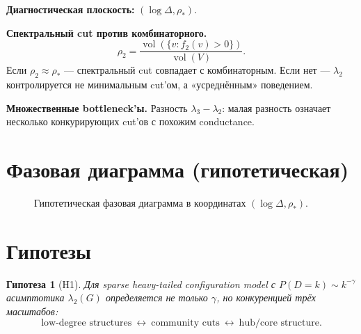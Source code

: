 \documentclass[11pt,a4paper]{article}
\theoremstyle{plain}
\newtheorem{hypothesis}{Гипотеза}
\theoremstyle{definition}
\theoremstyle{remark}
\DeclareMathOperator{\vol}{vol}
\newcommand{\lamtwo}{\lambda_2}
\newcommand{\lamthree}{\lambda_3}
\begin{document}
\textbf{Диагностическая плоскость:} $(\log\Delta,\rho_*)$.

\textbf{Спектральный cut против комбинаторного.}
\begin{equation}
\rho_2=\frac{\vol(\{v:f_2(v)>0\})}{\vol(V)} .
\end{equation}
Если $\rho_2\approx\rho_*$ --- спектральный cut совпадает с комбинаторным.
Если нет --- $\lamtwo$ контролируется не минимальным cut'ом, а «усреднённым»
поведением.

\textbf{Множественные bottleneck'ы.} Разность $\lamthree-\lamtwo$: малая
разность означает несколько конкурирующих cut'ов с похожим conductance.

\section{Фазовая диаграмма (гипотетическая)}
\label{sec:phase}

\begin{figure}[h]
\centering
{}
\caption{Гипотетическая фазовая диаграмма в координатах $(\log\Delta,\rho_*)$.}
\label{fig:phase}
\end{figure}

\section{Гипотезы}
\label{sec:hypotheses}

\begin{hypothesis}[H1]
Для sparse heavy-tailed configuration model с $P(D=k)\sim k^{-\gamma}$
асимптотика $\lamtwo(G)$ определяется не только $\gamma$, но конкуренцией трёх
масштабов:
\begin{equation}
\text{low-degree structures}\ \leftrightarrow\
\text{community cuts}\ \leftrightarrow\
\text{hub/core structure}.
\end{equation}
\end{hypothesis}
\end{document}
